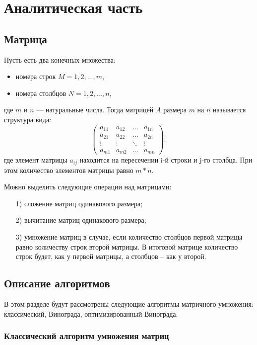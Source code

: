 \chapter{Аналитическая часть}
\section{Матрица}
Пусть есть два конечных множества:
\begin{itemize}
	\item  номера строк $M = {1, 2, ..., m}$,
	\item  номера столбцов $N = {1, 2, ..., n}$, 
\end{itemize}
где $m$ и $n$ --- натуральные числа.
Тогда матрицей $A$  размера $m$ на $n$ называется структура вида:  
\begin{equation}
	\begin{pmatrix}
		a_{11} & a_{12} & \ldots & a_{1n}\\
		a_{21} & a_{22} & \ldots & a_{2n}\\
		\vdots & \vdots & \ddots & \vdots\\
		a_{m1} & a_{m2} & \ldots & a_{mn}
	\end{pmatrix};
\end{equation}
где элемент матрицы $a_{ij}$  находится на пересечении i-й строки и j-го столбца. При этом количество элементов матрицы равно $m * n$.

Можно выделить следующие операции над матрицами:
\begin{enumerate}
	\item[1)]  сложение матриц одинакового размера;
	\item[2)]  вычитание матриц одинакового размера;
	\item[3)]  умножение матриц в случае, если количество столбцов первой матрицы равно количеству строк второй матрицы. В итоговой матрице количество строк будет, как у первой матрицы, а столбцов -- как у второй. \newline
\end{enumerate}


\section{Описание алгоритмов}
В этом разделе будут рассмотрены следующие алгоритмы матричного умножения: классический, Винограда, оптимизированный Винограда.

\subsection{Классический алгоритм умножения матриц}

